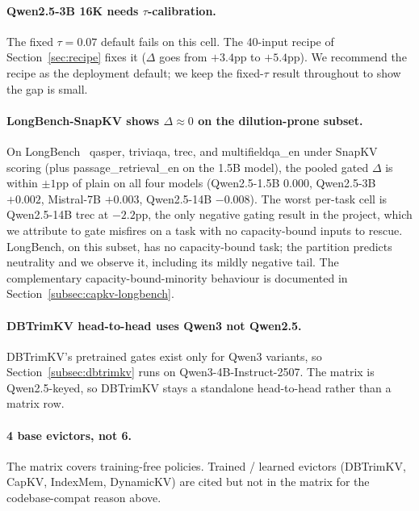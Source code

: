 \documentclass{article}
\begin{document}
\paragraph{Qwen2.5-3B 16K needs $\tau$-calibration.} The fixed
$\tau = 0.07$ default fails on this cell. The 40-input recipe of
Section~\ref{sec:recipe} fixes it ($\Delta$ goes from $+3.4$pp to
$+5.4$pp). We recommend the recipe as the deployment default; we keep
the fixed-$\tau$ result throughout to show the gap is small.

\paragraph{LongBench-SnapKV shows $\Delta \approx 0$ on the
dilution-prone subset.} On LongBench~\citep{arxiv230814508} qasper,
triviaqa, trec, and multifieldqa\_en under SnapKV scoring (plus
passage\_retrieval\_en on the 1.5B model), the pooled gated $\Delta$ is
within $\pm 1$pp of plain on all four models (Qwen2.5-1.5B $0.000$,
Qwen2.5-3B $+0.002$, Mistral-7B $+0.003$, Qwen2.5-14B $-0.008$). The
worst per-task cell is Qwen2.5-14B trec at $-2.2$pp, the only negative
gating result in the project, which we attribute to gate misfires on a
task with no capacity-bound inputs to rescue. LongBench, on this
subset, has no capacity-bound task; the partition predicts neutrality
and we observe it, including its mildly negative tail. The
complementary capacity-bound-minority behaviour
is documented in Section~\ref{subsec:capkv-longbench}.

\paragraph{DBTrimKV head-to-head uses Qwen3 not Qwen2.5.} DBTrimKV's
pretrained gates exist only for Qwen3 variants, so
Section~\ref{subsec:dbtrimkv} runs on Qwen3-4B-Instruct-2507. The
matrix is Qwen2.5-keyed, so DBTrimKV stays a standalone head-to-head
rather than a matrix row.

\paragraph{4 base evictors, not 6.} The matrix covers training-free
policies. Trained / learned evictors (DBTrimKV, CapKV, IndexMem,
DynamicKV) are cited but not in the matrix for the codebase-compat
reason above.
\end{document}
